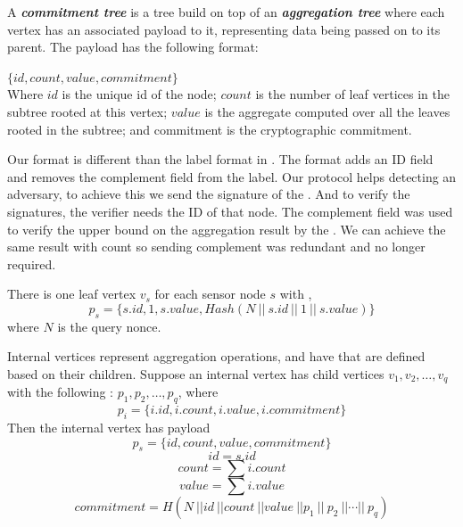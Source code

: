 	\begin{definition}\cite{chan2006secure}\label{def:ct}
		A \textbf{\textit{commitment tree}} is a tree build on top of an \textbf{\textit{aggregation tree}} where each vertex has an associated payload to it, representing data being passed on to its parent. The payload has the following format:

		$\{id, count, value, commitment\}$\\
		Where $id$ is the unique id of the node; $count$ is the number of leaf vertices in the subtree rooted at this vertex; $value$ is the aggregate computed over all the leaves rooted in the subtree; and commitment is the cryptographic commitment.

	\end{definition}

	Our \payload format is different than the label format in \cite{chan2006secure}.
	The \payload format adds an ID field and removes the complement field from the label. 
	Our protocol helps detecting an adversary, to achieve this we send the signature of the \payload. 
	And to verify the signatures, the verifier needs the ID of that node.
	The complement field was used to verify the upper bound on the aggregation result by the \q.
	We can achieve the same result with count so sending complement was redundant and no longer required.     

	There is one leaf vertex $v_{s}$ for each sensor node $s$ with \payload ,
	\begin{equation}
		p_{s} = \{ s.id, 1,s.value, Hash( N\ ||\  s.id\ ||\  1\  ||\  s.value ) \} 
	\end{equation}
	where $N$ is the query nonce.

	Internal vertices represent aggregation operations, and have \payloads that are defined based on their children. Suppose an internal vertex has child vertices $v_{1}, v_{2},\dotsc, v_{q}$ with the following \payloads: $p_{1}, p_{2},\dotsc, p_{q}$, where
	\begin{equation}
		p_{i} = \{ i.id, i.count, i.value, i.commitment\} 
	\end{equation}
	Then the internal vertex has payload 
	\begin{equation}
		p_{s} = \{ id, count, value, commitment \} 
	\end{equation}
	\begin{equation}
		id = s.id 
	\end{equation}	
	\begin{equation}
		count = \sum{i.count}		
	\end{equation}
	\begin{equation}
		value = \sum{i.value}		
	\end{equation}
	\begin{equation}
		commitment = H (N\ ||  id\ ||  count\ ||  value\ || p_{1}\ ||\ p_{2}\ || \dotsb ||\ p_{q})		
	\end{equation}

